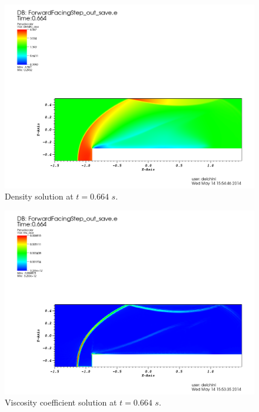 \begin{figure}[H]
\centering
\includegraphics[scale=.50]{figures/FFSDensityEqualTo0p664.png}
\caption{Density solution at $t=0.664$ $s$.}
\label{fig:2d_ffs_rho_0664}
\end{figure}
%
\begin{figure}[H]
\centering
\includegraphics[scale=.50]{figures/FFSViscEqualTo0p664.png}
\caption{Viscosity coefficient solution at $t=0.664$ $s$.}
\label{fig:2d_ffs_visc_0664}
\end{figure}
%
